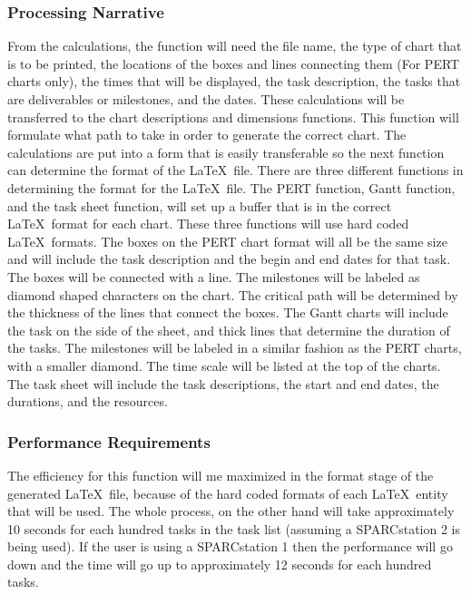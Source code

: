 \subsubsection{Processing Narrative}

From the calculations, the function will need the file name, the type
of chart that is to be printed, the locations of the boxes and lines
connecting them (For PERT charts only), the times that will be
displayed, the task description, the tasks that are deliverables or
milestones, and the dates. These calculations will be transferred to
the chart descriptions and dimensions functions. This function will
formulate what path to take in order to generate the correct chart.
The calculations are put into a form that is easily transferable so
the next function can determine the format of the \LaTeX\ file. There
are three different functions in determining the format for the
\LaTeX\ file. The PERT function, Gantt function, and the task sheet
function, will set up a buffer that is in the correct \LaTeX\ format
for each chart. These three functions will use hard coded \LaTeX\
formats. The boxes on the PERT chart format will all be the same size
and will include the task description and the begin and end dates for
that task. The boxes will be connected with a line. The milestones
will be labeled as diamond shaped characters on the chart. The
critical path will be determined by the thickness of the lines that
connect the boxes. The Gantt charts will include the task on the side
of the sheet, and thick lines that determine the duration of the
tasks. The milestones will be labeled in a similar fashion as the PERT
charts, with a smaller diamond. The time scale will be listed at the
top of the charts. The task sheet will include the task descriptions,
the start and end dates, the durations, and the resources.

\subsubsection{Performance Requirements}

The efficiency for this function will me maximized in the format stage
of the generated \LaTeX\ file, because of the hard coded formats of each
\LaTeX\ entity that will be used. The whole process, on the other hand
will take approximately 10 seconds for each hundred tasks in the task
list (assuming a SPARCstation 2 is being used). If the user is using a
SPARCstation 1 then the performance will go down and the time will go
up to approximately 12 seconds for each hundred tasks. 

